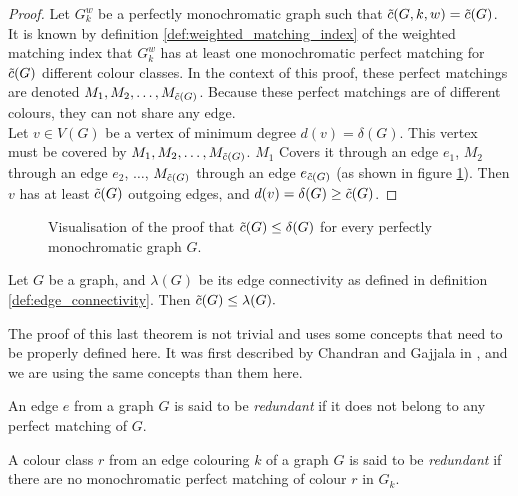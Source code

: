 \begin{proof}
    Let $G_k^w$ be a perfectly monochromatic graph such that $\Tilde{c}(G, k, w) = \Tilde{c}(G)$. It is known by definition \ref{def:weighted_matching_index} of the weighted matching index that $G_k^w$ has at least one monochromatic perfect matching for $\Tilde{c}(G)$ different colour classes. In the context of this proof, these perfect matchings are denoted $M_1, M_2, \dots, M_{\Tilde{c}(G)}$. Because these perfect matchings are of different colours, they can not share any edge.\\
    
    Let $v \in V(G)$ be a vertex of minimum degree $d(v) = \delta(G)$. This vertex must be covered by $M_1, M_2, \dots, M_{\Tilde{c}(G)}$. $M_1$ Covers it through an edge $e_1$, $M_2$ through an edge $e_2$, $\dots$, $M_{\Tilde{c}(G)}$ through an edge $e_{\Tilde{c}(G)}$ (as shown in figure \ref{fig:proof_min_degree}). Then $v$ has at least $\Tilde{c}(G)$ outgoing edges, and $d(v) = \delta(G) \geq \Tilde{c}(G)$.
\end{proof}

\begin{figure}[H]
    \caption{Visualisation of the proof that $\Tilde{c}(G) \leq \delta(G)$ for every perfectly monochromatic graph $G$.}
    \label{fig:proof_min_degree}
\end{figure}

\begin{theorem}
    \label{thm:bound_edge_connectivity}
    Let $G$ be a graph, and $\lambda(G)$ be its edge connectivity as defined in definition \ref{def:edge_connectivity}. Then $\Tilde{c}(G) \leq \lambda(G).$
\end{theorem}

The proof of this last theorem is not trivial and uses some concepts that need to be properly defined here. It was first described by Chandran and Gajjala in \cite{chandran}, and we are using the same concepts than them here.

\begin{definition}
    \label{def:redundant_edge}
    An edge $e$ from a graph $G$ is said to be \textit{redundant} if it does not belong to any perfect matching of $G$.
\end{definition}

\begin{definition}
    \label{def:redundant_colour_class}
    A colour class $r$ from an edge colouring $k$ of a graph $G$ is said to be \textit{redundant} if there are no monochromatic perfect matching of colour $r$ in $G_k$.
\end{definition}

